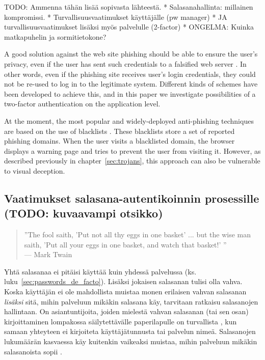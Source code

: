 \documentclass[english,gradu]{tktltiki}
\begin{document}
TODO: Ammenna tähän lisää sopivasta lähteestä.
* Salasanahallinta: millainen kompromissi.
* Turvallisuusvaatimukset käyttäjälle (pw manager)
* JA turvallisuusvaatimukset lisäksi myös palvelulle (2-factor)
* ONGELMA: Kuinka matkapuhelin ja sormitietokone?

A good solution against the web site phishing should be able to ensure the user's privacy, even if the user has sent such credentials to a falsified web server \cite{phishing_attacks_and_solutions_2007}. In other words, even if the phishing site receives user's login credentials, they could not be re-used to log in to the legitimate system. Different kinds of schemes have been developed to achieve this, and in this paper we investigate possibilities of a two-factor authentication \cite{NIST_SP800-63, schneier_2factor_2005, google_2step_2010} on the application level.

At the moment, the most popular and widely-deployed anti-phishing techniques are based on the use of blacklists \cite{visual_similarity_phishing_2008}. These blacklists store a set of reported phishing domains. When the user visits a blacklisted domain, the browser displays a warning page and tries to prevent the user from visiting it. However, as described previously in chapter~\ref{sec:trojans}, this approach can also be vulnerable to visual deception.



\subsection{Vaatimukset salasana-autentikoinnin prosessille (TODO: kuvaavampi otsikko)} %
\label{sub:vaatimukset_salasana_autentikoinnin_prosessille_todo_kuvaavampi_otsikko_}

           \begin{quote}
               ''The fool saith, 'Put not all thy eggs in one basket' ...
               but the wise man saith, 'Put all your eggs in one basket, and watch that basket!' ''
               \\--- Mark Twain \cite{twain_eggs_1894}
           \end {quote}

         Yhtä salasanaa ei pitäisi käyttää kuin yhdessä palvelussa (ks. luku~\ref{sec:passwords_de_facto}). Lisäksi jokaisen salasanan tulisi olla vahva. Koska käyttäjän ei ole mahdollista muistaa monen erilaisen vahvan salasanan \emph{lisäksi} sitä, mihin palveluun mikäkin salasana käy, tarvitaan ratkaisu salasanojen hallintaan. On asiantuntijoita, joiden mielestä vahvan salasanan (tai sen osan) kirjoittaminen lompakossa säilytettävälle paperilapulle on turvallista \cite{fsecure_passwords_on_postit_09, microsoft_guru_write_your_password_05, schneier_changing_passwords_10, schneier_choosing_passwords_07, schneier_write_down_your_password_05}, kun samaan yhteyteen ei kirjoiteta käyttäjätunnusta tai palvelun nimeä. Salasanojen lukumäärän kasvaessa käy kuitenkin vaikeaksi muistaa, mihin palveluun mikäkin salasanoista sopii \cite{study_of_passwords_07}.
\end{document}
